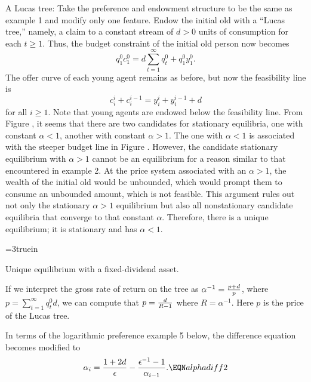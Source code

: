 \medskip
{}
\quad  A Lucas tree:
  Take the preference and endowment
structure to be the same as example 1 and modify only one feature.
Endow the initial old with a ``Lucas tree,'' namely, a claim
to a constant stream of $d >0$ units of consumption for each
$t\geq 1$.
%
%
   Thus, the budget constraint of the initial old person now becomes
$$ q_1^0 c_1^0 = d \sum_{t=1}^\infty q_t^0 + q_1^0 y_1^0. $$
The offer curve of each young agent remains as before,
but now the feasibility line is
$$ c_i^i + c^{i-1}_i =  y_i^i + y^{i-1}_i + d $$
for all $i \geq 1$.  Note that young agents are  endowed
below the feasibility line.  From Figure , %
it seems that there
are  two candidates for stationary equilibria, one
with constant  $\alpha < 1$, another with constant $\alpha >1$.
The one with $\alpha  <1$ is associated with the
steeper budget line in Figure . %
 However, the candidate stationary
equilibrium with $ \alpha >1 $ cannot be an equilibrium for a reason
similar to that encountered in example 2.  At the price
system associated with an $\alpha >1$, the wealth of the initial
old would be unbounded, which would prompt them to consume an
unbounded amount, which is not feasible.
This argument rules out not only the stationary $\alpha >1$ equilibrium
but also all nonstationary candidate equilibria that converge to
that constant $\alpha$.  Therefore, there is a unique equilibrium;
it is stationary and has $\alpha < 1$.


\centerline{\epsfxsize=3truein}
\caption{Unique equilibrium with a fixed-dividend asset.}
\endfigure

    If we interpret the gross rate of return on the
tree as $\alpha^{-1} = {p + d  \over p}$, where $p = \sum_{t=1}^\infty
q_t^0 d$, we can compute that $p = {d \over R-1}$ where
$R = \alpha^{-1}$.  Here $p$ is the price of the
Lucas tree.

    In terms of the logarithmic preference example 5 below, the difference equation
 becomes modified to
$$ \alpha_i = {1 + 2d \over \epsilon} - {\epsilon^{-1} -1 \over \alpha_{i-1}}.
    \EQN alphadiff2 $$


